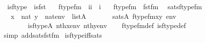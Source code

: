 \begin{isabellebody}
\ \ {\isachardoublequoteopen}is{\isacharunderscore}{\kern0pt}ftype\ {\isasymequiv}\ is{\isacharunderscore}{\kern0pt}fst{\isachardoublequoteclose}\ \isanewline
\isanewline
{}\isamarkupfalse%
\isanewline
\ \ ftype{\isacharunderscore}{\kern0pt}fm\ {\isacharcolon}{\kern0pt}{\isacharcolon}{\kern0pt}\ {\isachardoublequoteopen}{\isacharbrackleft}{\kern0pt}i{\isacharcomma}{\kern0pt}i{\isacharbrackright}{\kern0pt}\ {\isasymRightarrow}\ i{\isachardoublequoteclose}\ \isanewline
\ \ {\isachardoublequoteopen}ftype{\isacharunderscore}{\kern0pt}fm\ {\isasymequiv}\ fst{\isacharunderscore}{\kern0pt}fm{\isachardoublequoteclose}\ \isanewline
\isanewline
{}\isamarkupfalse%
\ sats{\isacharunderscore}{\kern0pt}ftype{\isacharunderscore}{\kern0pt}fm\ {\isacharcolon}{\kern0pt}\isanewline
\ \ {\isachardoublequoteopen}{\isasymlbrakk}\ x\ {\isasymin}\ nat{\isacharsemicolon}{\kern0pt}\ y\ {\isasymin}\ nat{\isacharsemicolon}{\kern0pt}env\ {\isasymin}\ list{\isacharparenleft}{\kern0pt}A{\isacharparenright}{\kern0pt}\ {\isasymrbrakk}\ \isanewline
\ \ \ \ {\isasymLongrightarrow}\ sats{\isacharparenleft}{\kern0pt}A{\isacharcomma}{\kern0pt}\ ftype{\isacharunderscore}{\kern0pt}fm{\isacharparenleft}{\kern0pt}x{\isacharcomma}{\kern0pt}y{\isacharparenright}{\kern0pt}{\isacharcomma}{\kern0pt}\ env{\isacharparenright}{\kern0pt}\ {\isasymlongleftrightarrow}\isanewline
\ \ \ \ \ \ \ \ is{\isacharunderscore}{\kern0pt}ftype{\isacharparenleft}{\kern0pt}{\isacharhash}{\kern0pt}{\isacharhash}{\kern0pt}A{\isacharcomma}{\kern0pt}\ nth{\isacharparenleft}{\kern0pt}x{\isacharcomma}{\kern0pt}env{\isacharparenright}{\kern0pt}{\isacharcomma}{\kern0pt}\ nth{\isacharparenleft}{\kern0pt}y{\isacharcomma}{\kern0pt}env{\isacharparenright}{\kern0pt}{\isacharparenright}{\kern0pt}{\isachardoublequoteclose}\isanewline
%
\isadelimproof
\ \ %
\endisadelimproof
%
\isatagproof
{}\isamarkupfalse%
\ ftype{\isacharunderscore}{\kern0pt}fm{\isacharunderscore}{\kern0pt}def\ is{\isacharunderscore}{\kern0pt}ftype{\isacharunderscore}{\kern0pt}def\isanewline
\ \ \isamarkupfalse%
\ {\isacharparenleft}{\kern0pt}simp\ add{\isacharcolon}{\kern0pt}sats{\isacharunderscore}{\kern0pt}fst{\isacharunderscore}{\kern0pt}fm{\isacharparenright}{\kern0pt}%
\endisatagproof
{\isafoldproof}%
%
\isadelimproof
\isanewline
%
\endisadelimproof
\isanewline
{}\isamarkupfalse%
\ is{\isacharunderscore}{\kern0pt}ftype{\isacharunderscore}{\kern0pt}iff{\isacharunderscore}{\kern0pt}sats{\isacharcolon}{\kern0pt}\isanewline
\ \ \isanewline

\end{isabellebody}
